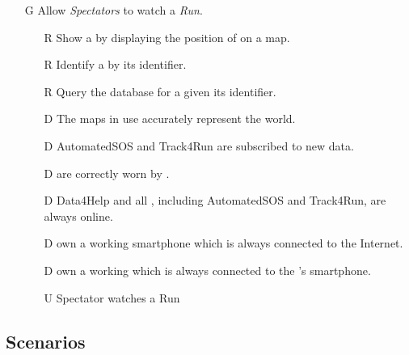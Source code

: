 \documentclass[../../rasd.tex]{subfiles}
\begin{document}
\begin{itemize}
            \item[G\subs{10}]Allow \textit{Spectators} to watch a \textit{Run}.
            \begin{itemize}
                \item[R\subs{44}]Show a  by displaying the position of  on a map.
                \item[R\subs{45}]Identify a  by its identifier.
                \item[R\subs{46}]Query the database for a  given its identifier.
                \\
                \item[D\subs{3}]The maps in use accurately represent the world.
                \item[D\subs{6}]AutomatedSOS and Track4Run are subscribed to new data.
                \item[D\subs{8}] are correctly worn by .
                \item[D\subs{9}]Data4Help and all , including AutomatedSOS and Track4Run, are always online.
                \item[D\subs{10}] own a working smartphone which is always connected to the Internet.
                \item[D\subs{11}] own a working  which is always connected to the 's smartphone.
                \\
                \item[U\subs{15}]Spectator watches a Run
            \end{itemize}
        \end{itemize}











        \subsection{Scenarios}
\end{document}
